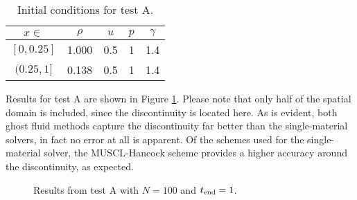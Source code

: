 \documentclass[final,3p,twocolumn]{elsarticle}
\begin{document}
\begin{table}[htb]
    \label{tab:testA}
    \centering
    \begin{tabular}{ccccc}
        \hline
        $x \in $ & $\rho$ & $u$ & $p$ & $\gamma$ \\
        \hline
        $[0,0.25]$ & 1.000 & 0.5 & 1 & 1.4 \\
        $(0.25,1]$ & 0.138 & 0.5 & 1 & 1.4 \\
        \hline
    \end{tabular}
    \caption{Initial conditions for test A.}
\end{table}

Results for test A are shown in Figure \ref{fig:testA}. Please note that only
half of the spatial domain is included, since the discontinuity is located
here. As is evident, both ghost fluid methods capture the discontinuity far
better than the single-material solvers, in fact no error at all is apparent.
Of the schemes used for the single-material solver, the MUSCL-Hancock scheme
provides a higher accuracy around the discontinuity, as expected. 


\begin{figure}[htb]
    \centering
    \caption[caption]
    {
        Results from test A with $N=100$ and $t_{\rm end}=1$. 
    }
    \label{fig:testA}
\end{figure}
\end{document}
